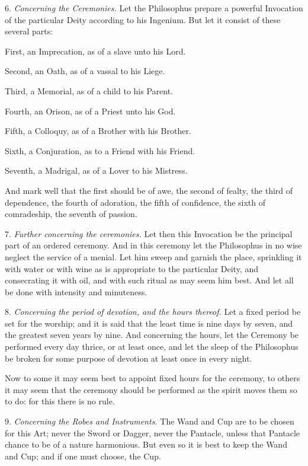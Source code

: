 6. \textit{Concerning the Ceremonies.} Let the Philosophus prepare a powerful Invocation of the particular Deity according to his Ingenium. But let it consist of these several parts:
\begin{description}
\item First, an Imprecation, as of a slave unto his Lord.
\item Second, an Oath, as of a vassal to his Liege.
\item Third, a Memorial, as of a child to his Parent.
\item Fourth, an Orison, as of a Priest unto his God.
\item Fifth, a Colloquy, as of a Brother with his Brother.
\item Sixth, a Conjuration, as to a Friend with his Friend.
\item Seventh, a Madrigal, as of a Lover to his Mistress.
\end{description}

And mark well that the first should be of awe, the second of fealty, the third of dependence, the fourth of adoration, the fifth of confidence, the sixth of comradeship, the seventh of passion.

7. \textit{Further concerning the ceremonies.} Let then this Invocation be the principal part of an ordered ceremony. And in this ceremony let the Philosophus in no wise neglect the service of a menial. Let him sweep and garnish the place, sprinkling it with water or with wine as is appropriate to the particular Deity, and consecrating it with oil, and with such ritual as may seem him best. And let all be done with intensity and minuteness.

8. \textit{Concerning the period of devotion, and the hours thereof.} Let a fixed period be set for the worship; and it is said that the least time is nine days by seven, and the greatest seven years by nine. And concerning the hours, let the Ceremony be performed every day thrice, or at least once, and let the sleep of the Philosophus be broken for some purpose of devotion at least once in every night.

Now to some it may seem best to appoint fixed hours for the ceremony, to others it may seem that the ceremony should be performed as the spirit moves them so to do: for this there is no rule.

9. \textit{Concerning the Robes and Instruments.} The Wand and Cup are to be chosen for this Art; never the Sword or Dagger, never the Pantacle, unless that Pantacle chance to be of a nature harmonious. But even so it is best to keep the Wand and Cup; and if one must choose, the Cup.

